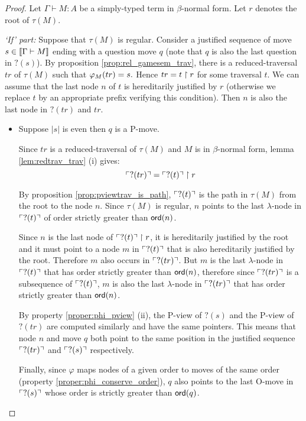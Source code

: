 \begin{proof}
Let $\Gamma \vdash M : A$ be a simply-typed term in $\beta$-normal form.
Let $r$ denotes the root of $\tau(M)$.

\noindent \emph{`If' part:} Suppose that $\tau(M)$ is regular.
Consider a justified sequence of move $s \in {[\![\Gamma \vdash M ]\!]}$
ending with a question move $q$ (note that $q$ is also the last question in $?(s)$).
By proposition \ref{prop:rel_gamesem_trav}, there
is a reduced-traversal $tr$ of $\tau(M)$ such that $\varphi_{M}(tr) = s.$
Hence $ tr = t \upharpoonright r$ for some traversal $t$. We can assume that the last node $n$ of $t$
is hereditarily justified by $r$ (otherwise we replace $t$ by an appropriate prefix verifying this condition).
Then $n$ is also the last node in $?(tr)$ and $tr$.

\begin{itemize}
\item Suppose $|s|$ is even then $q$ is a P-move.

Since $tr$ is a reduced-traversal of $\tau(M)$ and $M$ is in $\beta$-normal form, lemma \ref{lem:redtrav_trav} (i) gives:
\begin{equation*}
 \ulcorner ?(tr) \urcorner = \ulcorner ?(t) \urcorner \upharpoonright  r
\end{equation*}

By proposition \ref{prop:pviewtrav_is_path}, $\ulcorner ?(t) \urcorner$ is
the path in $\tau(M)$ from the root to the node $n$.
Since $\tau(M)$ is regular, $n$ points to the
last $\lambda$-node in $\ulcorner ?(t) \urcorner$ of order strictly greater than ${\sf ord}(n)$.

Since $n$ is the last node of $\ulcorner ?(t) \urcorner \upharpoonright r$,
it is hereditarily justified by the root and it must point to a node
$m$ in $\ulcorner ?(t) \urcorner$ that is also hereditarily justified by the
root. Therefore $m$ also occurs in $\ulcorner ?(tr) \urcorner$. But $m$ is the
last $\lambda$-node in $\ulcorner ?(t) \urcorner$ that has order strictly
greater than ${\sf ord}(n)$, therefore since $\ulcorner ?(tr) \urcorner$ is a
subsequence of $\ulcorner ?(t) \urcorner$, $m$ is also the last $\lambda$-node
in $\ulcorner ?(tr) \urcorner$ that has order strictly greater than
${\sf ord}(n)$.


By property \ref{proper:phi_pview} (ii), the P-view of $?(s)$ and the P-view of $?(tr)$ are computed
similarly and have the same pointers. This means that
node $n$ and  move $q$ both point to the same position in
the justified sequence $\ulcorner ?(tr) \urcorner$ and $\ulcorner ?(s) \urcorner$ respectively.

Finally, since $\varphi$ maps nodes of a given order to moves of the same order (property \ref{proper:phi_conserve_order}),
$q$ also points to the last O-move in $\ulcorner ?(s) \urcorner$ whose
order is strictly greater than ${\sf ord}(q)$.


\end{itemize}
\end{proof}
